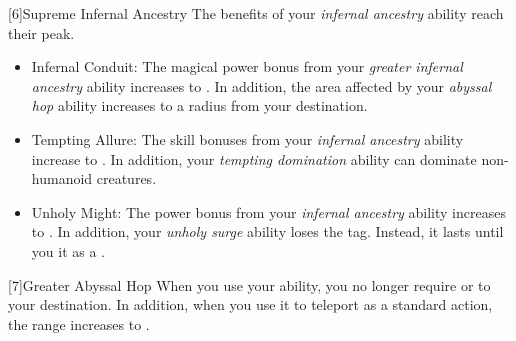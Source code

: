             [6]{Supreme Infernal Ancestry} The benefits of your \textit{infernal ancestry} ability reach their peak.
            \begin{itemize}
                \item Infernal Conduit: The magical power bonus from your \textit{greater infernal ancestry} ability increases to .
                    In addition, the area affected by your \textit{abyssal hop} ability increases to a \medarea radius from your destination.
                \item Tempting Allure: The skill bonuses from your \textit{infernal ancestry} ability increase to .
                    In addition, your \textit{tempting domination} ability can dominate non-humanoid creatures.
                \item Unholy Might: The power bonus from your \textit{infernal ancestry} ability increases to .
                    In addition, your \textit{unholy surge} ability loses the  tag.
                    Instead, it lasts until you  it as a .
            \end{itemize}

            [7]{Greater Abyssal Hop} When you use your  ability, you no longer require  or  to your destination.
            In addition, when you use it to teleport as a standard action, the range increases to \distrange.




